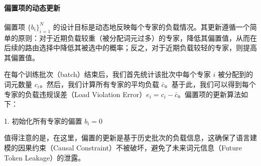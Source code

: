 \paragraph{偏置项的动态更新}
偏置项 $\{b_i\}_{i=1}^N$ 的设计目标是动态地反映每个专家的负载情况。其更新遵循一个简单的原则：对于近期负载较重（被分配词元过多）的专家，降低其偏置值，从而在后续的路由选择中降低其被选中的概率；反之，对于近期负载较轻的专家，则提高其偏置值。

在每个训练批次（batch）结束后，我们首先统计该批次中每个专家 $i$ 被分配到的词元数量 $c_i$。然后，我们计算所有专家的平均负载 $\bar{c}$。基于此，我们可以得到每个专家的负载违规误差（Load Violation Error）$e_i = c_i - \bar{c}$。偏置项的更新算法如下：

\begin{algorithm}[t]
\SetAlgoLined
1. 初始化所有专家的偏置 $b_i = 0$\;
\caption{训练过程中调整各专家偏置 $b_i$}
\label{algo:PID_gate}
\end{algorithm}


值得注意的是，在这里，偏置的更新是基于历史批次的负载信息，这确保了语言建模的因果约束（Causal Constraint）不被破坏，避免了未来词元信息（Future Token Leakage）的泄露。

